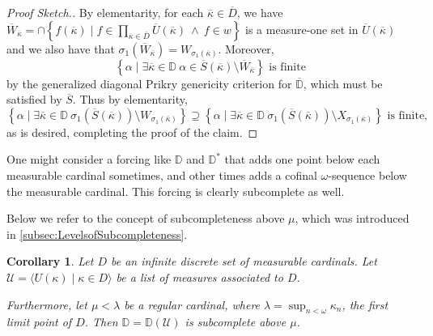 \documentclass{amsart}
\newtheorem{corollary}[theorem]{Corollary}
\theoremstyle{definition}
\theoremstyle{remark}
\newcommand{\D}{\mathbb{D}}
\renewcommand{\S}{{\overline{S}}}
\newcommand{\U}{\mathcal{U}}
\newcommand{\st}{\; | \;}
\newcommand{\set}[2]{\left\{#1\st #2 \right\}}
\newcommand{\seq}[2]{\langle #1 \st #2 \rangle}
\begin{document}
\begin{proof}[Proof Sketch.]
By elementarity, for each $\overline \kappa \in \overline D$, we have $\overline W_{\overline \kappa} = \cap \set{f(\overline \kappa) }{ f \in \prod_{\overline \kappa \in \overline D} \overline U(\overline \kappa) \ \land \ f \in w }$ is a measure-one set in $\overline U(\overline \kappa)$ and we also have that $\sigma_1(\overline W_{\overline \kappa}) = W_{\sigma_1(\overline \kappa)}$. Moreover, 
$$\set{ \alpha }{ \exists \overline \kappa \in \D \ \alpha \in \overline S(\overline \kappa) \setminus \overline W_{\overline \kappa} } \text{ is finite}$$ by the generalized diagonal Prikry genericity criterion for $\overline{\D}$, which must be satisfied by $\overline S$.
Thus by elementarity,
$$\set{ \alpha }{ \exists \overline \kappa \in \D \ \sigma_1(\S(\overline \kappa)) \setminus W_{\sigma_1(\overline \kappa)} } \supseteq \set{ \alpha }{ \exists \overline \kappa \in \D \ \sigma_1(\S(\overline \kappa)) \setminus X_{\sigma_1(\overline \kappa)}} \text{ is finite,}$$
as is desired, completing the proof of the claim. 
\end{proof}

One might consider a forcing like $\D$ and $\D^*$ that adds one point below each measurable cardinal sometimes, and other times adds a cofinal $\omega$-sequence below the measurable cardinal. This forcing is clearly subcomplete as well.

Below we refer to the concept of subcompleteness above $\mu$, which was introduced in \ref{subsec:LevelsofSubcompleteness}.


\begin{corollary} Let $D$ be an infinite discrete set of measurable cardinals. Let $\U = \seq{ U(\kappa) }{ \kappa \in D }$ be a list of measures associated to $D$. 

Furthermore, let $\mu < \lambda$ be a regular cardinal, where $\lambda = \sup_{n<\omega} \kappa_n$, the first limit point of $D$.
Then $\D=\D(\U)$ is subcomplete above $\mu$. \end{corollary}
\end{document}
